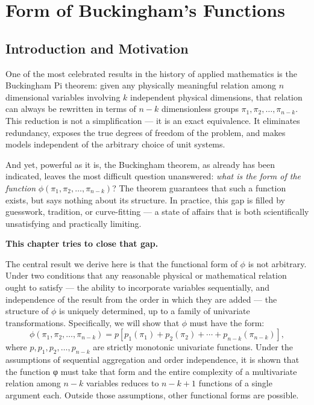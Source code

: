 \startcontents[chapter]
\chapter{Form of Buckingham's Functions}
\label{ch:Piforms}
\minitocboxed


\section*{Introduction and Motivation}

One of the most celebrated results in the history of applied mathematics is the
Buckingham Pi theorem: given any physically meaningful relation among $n$ dimensional
variables involving $k$ independent physical dimensions, that relation can always be
rewritten in terms of $n - k$ dimensionless groups $\pi_1, \pi_2, \ldots, \pi_{n-k}$.
This reduction is not a simplification — it is an exact equivalence. It eliminates
redundancy, exposes the true degrees of freedom of the problem, and makes models
independent of the arbitrary choice of unit systems.

And yet, powerful as it is, the Buckingham theorem, as already has been indicated, leaves the most difficult question
unanswered: \emph{what is the form of the function}
$\phi(\pi_1, \pi_2, \ldots, \pi_{n-k})$?
The theorem guarantees that such a function exists, but says nothing about its
structure. In practice, this gap is filled by guesswork, tradition, or curve-fitting
— a state of affairs that is both scientifically unsatisfying and practically limiting.

\textbf{This chapter tries to close that gap.}

The central result we derive here is that the functional form of $\phi$ is not
arbitrary. Under two conditions that any reasonable physical or mathematical relation
ought to satisfy — the ability to incorporate variables sequentially, and independence
of the result from the order in which they are added — the structure of $\phi$ is
uniquely determined, up to a family of univariate transformations. Specifically, we
will show that $\phi$ must have the form:
\begin{equation}\label{eq:seqorderIndep}
\boxed{\phi(\pi_1,\pi_2,\ldots,\pi_{n-k}) = p\!\left[p_1(\pi_1) + p_2(\pi_2) + \cdots +
p_{n-k}(\pi_{n-k})\right],}
\end{equation}
where $p, p_1, p_2, \ldots, p_{n-k}$ are strictly monotonic univariate functions.
Under the assumptions of sequential aggregation and order independence, it is shown that the function φ must take that form and the entire complexity of a
multivariate relation among $n-k$ variables reduces to $n - k + 1$ functions of a
single argument each. Outside those assumptions, other functional forms are possible.

